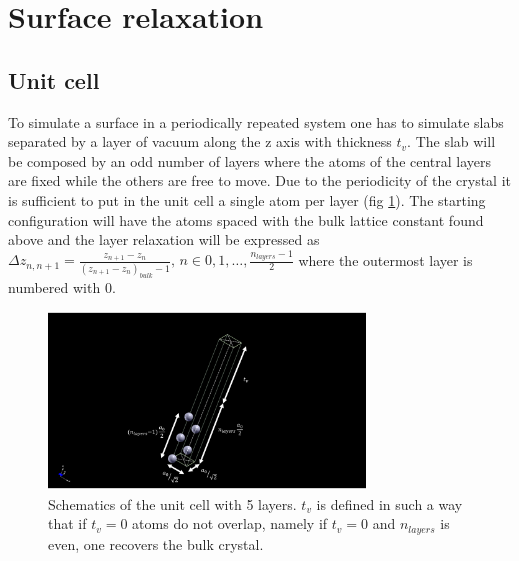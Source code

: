 \documentclass[a4paper, 11pt]{article}
\begin{document}
\section{Surface relaxation}
  \subsection{Unit cell}
    To simulate a surface in a periodically repeated system one has to simulate slabs separated by a layer of vacuum along the z axis with thickness $t_v$. The slab will be composed by an odd number of layers where the atoms of the central layers are fixed while the others are free to move. Due to the periodicity of the crystal it is sufficient to put in the unit cell a single atom per layer (fig \ref{fig:cell}). The starting configuration will have the atoms spaced with the bulk lattice constant found above and the layer relaxation will be expressed as $\Delta z_{n,n+1} = \frac{z_{n+1} - z_n}{\left(z_{n+1} - z_n \right)_{bulk} -1},\, n \in 0,1,\dots,\frac{n_{layers} - 1}{2}$ where the outermost layer is numbered with 0.

    \begin{figure}
      \centering
      \includegraphics[width=0.75\textwidth]{img/al-nl5-cell.pdf}
      \caption{Schematics of the unit cell with 5 layers. $t_v$ is defined in such a way that if $t_v = 0$ atoms do not overlap, namely if $t_v = 0$ and $n_{layers}$ is even, one recovers the bulk crystal.}
      \label{fig:cell}
    \end{figure}
\end{document}
